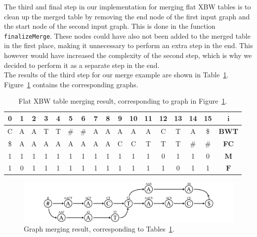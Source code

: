 \documentclass[a4paper,12pt,twoside,BCOR=10mm]{scrbook}
\begin{document}
The third and final step in our implementation for merging flat XBW tables
is to clean up the merged table by removing the end node of the first input graph
and the start node of the second input graph.
This is done in the function \texttt{finalizeMerge}.
These nodes could have also not been added to the merged table in the first place,
making it unnecessary to perform an extra step in the end.
This however would have increased the complexity of the second step, which is why we
decided to perform it as a separate step in the end. \\
The results of the third step for our merge example are shown in
Table~\ref{table:evo_fig_flat_merge_step_three}.
Figure~\ref{fig:evo_fig_flat_merge_step_three} contains the corresponding graphs.

\begin{table}[htb]
\centering
\caption[Flat XBW merging result]{Flat XBW table merging result, corresponding to graph in Figure~\ref{fig:evo_fig_flat_merge_step_three}.}
{
\renewcommand{\tabcolsep}{5pt}
\begin{tabular}{ | c | c | c | c | c | c | c | c | c | c | c | c | c | c | c | c | c | }
\hline
0 & 1 & 2 & 3 & 4 & 5 & 6 & 7 & 8 & 9 & 10 & 11 & 12 & 13 & 14 & 15 & $\boldsymbol{i}$ \\ \hline
C & A & A & T & T & $\#$ & $\#$ & A & A & A & A & A & C & T & A & \$ & \textbf{BWT} \\ \hline
\$ & A & A & A & A & A & A & A & A & C & C & T & T & T & $\#$ & $\#$ & \textbf{FC} \\ \hline
1 & 1 & 1 & 1 & 1 & 1 & 1 & 1 & 1 & 1 & 1 & 1 & 0 & 1 & 1 & 0 & $\boldsymbol{M}$ \\ \hline
1 & 0 & 1 & 1 & 1 & 1 & 1 & 1 & 1 & 1 & 1 & 1 & 1 & 0 & 1 & 1 & $\boldsymbol{F}$ \\ \hline
\end{tabular}
}
\label{table:evo_fig_flat_merge_step_three}
\end{table}
\begin{figure}[!htb]
\centering
\includegraphics[width=\textwidth]{evo_fig_flat_merge_step_three.pdf}
\caption[Graph merging result]{Graph merging result, corresponding to Tables~\ref{table:evo_fig_flat_merge_step_three}.} \label{fig:evo_fig_flat_merge_step_three}
\end{figure}
\end{document}
